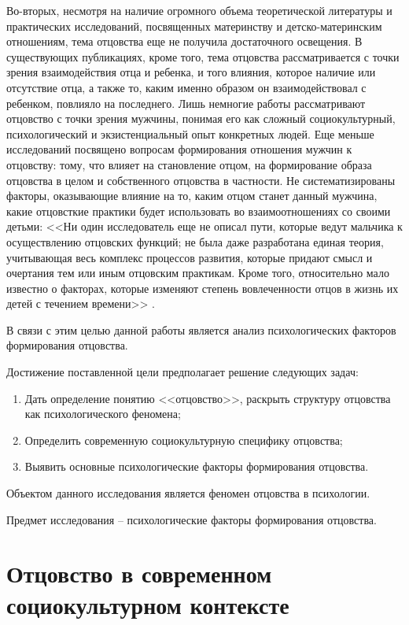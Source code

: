 \documentclass{../../common/thesisbyxetex}
\begin{document}
Во-вторых, несмотря на наличие огромного объема теоретической литературы и
практических исследований, посвященных материнству и детско-материнским отношениям, тема отцовства
еще не получила достаточного освещения. В существующих публикациях, кроме того, тема отцовства
рассматривается с точки зрения взаимодействия отца и ребенка, и того влияния, которое наличие
или отсутствие отца, а также то, каким именно образом он взаимодействовал с ребенком, повлияло на
последнего. Лишь немногие работы рассматривают отцовство с точки зрения мужчины,
понимая его как сложный социокультурный, психологический и экзистенциальный опыт конкретных людей.
Еще меньше исследований посвящено вопросам формирования отношения мужчин к отцовству:
тому, что влияет на становление отцом, на формирование образа отцовства в целом и собственного
отцовства в частности. Не систематизированы факторы, оказывающие влияние на то, каким отцом станет
данный мужчина, какие отцовсткие практики будет использовать во взаимоотношениях со своими детьми:
<<Ни один исследователь еще не описал пути, которые ведут мальчика к осуществлению отцовских
функций; не была даже разработана единая теория, учитывающая весь комплекс процессов развития,
которые придают смысл и очертания тем или иным отцовским практикам. Кроме того, относительно мало
известно о факторах, которые изменяют степень вовлеченности отцов в жизнь их детей с течением
времени>>  \cite[131]{f21}.

В связи с этим целью данной работы является анализ психологических факторов
формирования отцовства.

Достижение поставленной цели предполагает решение следующих задач:

\begin{enumerate}
	\item Дать определение понятию <<отцовство>>, раскрыть структуру отцовства как 
психологического
феномена;
	\item Определить современную социокультурную специфику отцовства;
	\item Выявить основные психологические факторы формирования отцовства.
\end{enumerate}

Объектом данного исследования является феномен отцовства в психологии.

Предмет исследования – психологические факторы формирования отцовства.


\chapter{Отцовство в современном социокультурном контексте}
\end{document}
